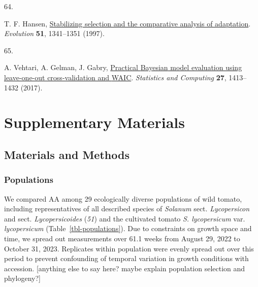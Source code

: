 \documentclass[
  letterpaper,
  DIV=11,
  numbers=noendperiod]{scrartcl}
\newlength{\cslhangindent}
\newlength{\csllabelwidth}
\newenvironment{CSLReferences}[2] %
 {\begin{list}{}{%
  \setlength{\itemindent}{0pt}
  \setlength{\leftmargin}{0pt}
  \setlength{\parsep}{0pt}
  \ifodd #1
   \setlength{\leftmargin}{\cslhangindent}
   \setlength{\itemindent}{-1\cslhangindent}
  \fi
  \setlength{\itemsep}{#2\baselineskip}}}
 {\end{list}}
\newcommand{\CSLLeftMargin}[1]{\parbox[t]{\csllabelwidth}{\strut#1\strut}}
\newcommand{\CSLRightInline}[1]{\parbox[t]{\linewidth - \csllabelwidth}{\strut#1\strut}}
\newcommand{\aax}{$\mathrm{AA}$}
\begin{document}
\begin{CSLReferences}{0}{1}
\CSLLeftMargin{64. }%
\CSLRightInline{T. F. Hansen,
\href{https://doi.org/10.1111/j.1558-5646.1997.tb01457.x}{Stabilizing
selection and the comparative analysis of adaptation}. \emph{Evolution}
\textbf{51}, 1341--1351 (1997).}

\CSLLeftMargin{65. }%
\CSLRightInline{A. Vehtari, A. Gelman, J. Gabry,
\href{https://doi.org/10.1007/s11222-016-9696-4}{Practical {Bayesian}
model evaluation using leave-one-out cross-validation and {WAIC}}.
\emph{Statistics and Computing} \textbf{27}, 1413--1432 (2017).}

\end{CSLReferences}

\newpage{}

\section{Supplementary Materials}\label{supplementary-materials}

\renewcommand{\thefigure}{S\arabic{figure}}
\renewcommand{\thetable}{S\arabic{table}}
\renewcommand{\theequation}{S\arabic{equation}}
\setcounter{figure}{0}
\setcounter{table}{0}
\setcounter{equation}{0}

\subsection{Materials and Methods}\label{sec-methods}

\subsubsection{Populations}\label{populations}

We compared \aax{} among 29 ecologically diverse populations of wild
tomato, including representatives of all described species of
\emph{Solanum} sect. \emph{Lycopersicon} and sect.
\emph{Lycopersicoides} (\emph{51}) and the cultivated tomato \emph{S.
lycopersicum} var. \emph{lycopersicum} (Table~\ref{tbl-populations}).
Due to constraints on growth space and time, we spread out measurements
over 61.1 weeks from August 29, 2022 to October 31, 2023. Replicates
within population were evenly spread out over this period to prevent
confounding of temporal variation in growth conditions with accession.
{[}anything else to say here? maybe explain population selection and
phylogeny?{]}
\end{document}
